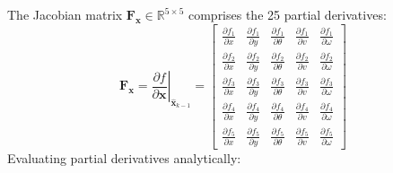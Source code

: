 \documentclass[11pt, a4paper]{article}
\begin{document}
The Jacobian matrix $\mathbf{F}_{\mathbf{x}} \in \mathbb{R}^{5 \times 5}$ comprises the 25 partial derivatives:
\begin{equation}
    \mathbf{F}_{\mathbf{x}} = \left. \frac{\partial f}{\partial \mathbf{x}} \right|_{\hat{\mathbf{x}}_{k-1}} = 
    \begin{bmatrix}
        \frac{\partial f_1}{\partial x} & \frac{\partial f_1}{\partial y} & \frac{\partial f_1}{\partial \theta} & \frac{\partial f_1}{\partial v} & \frac{\partial f_1}{\partial \omega} \\
        \frac{\partial f_2}{\partial x} & \frac{\partial f_2}{\partial y} & \frac{\partial f_2}{\partial \theta} & \frac{\partial f_2}{\partial v} & \frac{\partial f_2}{\partial \omega} \\
        \frac{\partial f_3}{\partial x} & \frac{\partial f_3}{\partial y} & \frac{\partial f_3}{\partial \theta} & \frac{\partial f_3}{\partial v} & \frac{\partial f_3}{\partial \omega} \\
        \frac{\partial f_4}{\partial x} & \frac{\partial f_4}{\partial y} & \frac{\partial f_4}{\partial \theta} & \frac{\partial f_4}{\partial v} & \frac{\partial f_4}{\partial \omega} \\
        \frac{\partial f_5}{\partial x} & \frac{\partial f_5}{\partial y} & \frac{\partial f_5}{\partial \theta} & \frac{\partial f_5}{\partial v} & \frac{\partial f_5}{\partial \omega}
    \end{bmatrix}
\end{equation}
Evaluating partial derivatives analytically:
\end{document}
